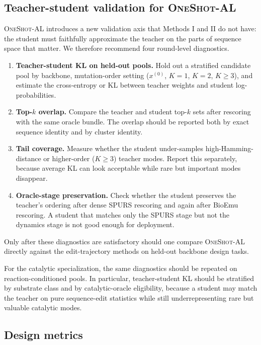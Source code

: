 \documentclass[11pt]{article}
\newcommand{\methodIII}{\textsc{OneShot-AL}}
\begin{document}
	\subsection{Teacher-student validation for \methodIII{}}
	
	\methodIII{} introduces a new validation axis that Methods I and II do not have: the student must faithfully approximate the teacher on the parts of sequence space that matter. We therefore recommend four round-level diagnostics.
	\begin{enumerate}[leftmargin=1.5em]
		\item \textbf{Teacher-student KL on held-out pools.} Hold out a stratified candidate pool by backbone, mutation-order setting ($x^{(0)}$, $K=1$, $K=2$, $K\ge 3$), and estimate the cross-entropy or KL between teacher weights and student log-probabilities.
		\item \textbf{Top-$k$ overlap.} Compare the teacher and student top-$k$ sets after rescoring with the same oracle bundle. The overlap should be reported both by exact sequence identity and by cluster identity.
		\item \textbf{Tail coverage.} Measure whether the student under-samples high-Hamming-distance or higher-order ($K\ge 3$) teacher modes. Report this separately, because average KL can look acceptable while rare but important modes disappear.
		\item \textbf{Oracle-stage preservation.} Check whether the student preserves the teacher's ordering after dense SPURS rescoring and again after BioEmu rescoring. A student that matches only the SPURS stage but not the dynamics stage is not good enough for deployment.
	\end{enumerate}
	Only after these diagnostics are satisfactory should one compare \methodIII{} directly against the edit-trajectory methods on held-out backbone design tasks.
	
	For the catalytic specialization, the same diagnostics should be repeated on reaction-conditioned pools. In particular, teacher-student KL should be stratified by substrate class and by catalytic-oracle eligibility, because a student may match the teacher on pure sequence-edit statistics while still underrepresenting rare but valuable catalytic modes.
	
	\subsection{Design metrics}
	
\end{document}
